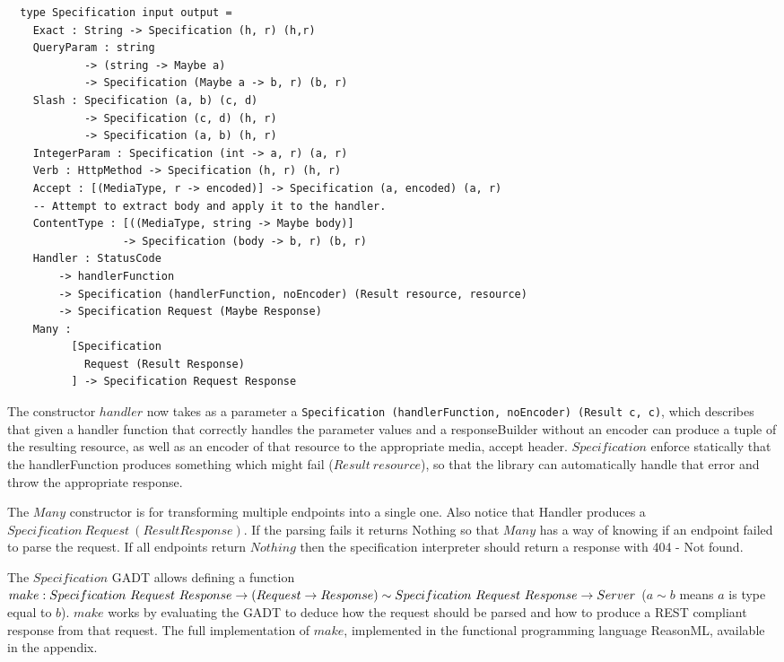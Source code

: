 \begin{lstlisting}
  type Specification input output =
    Exact : String -> Specification (h, r) (h,r)
    QueryParam : string 
            -> (string -> Maybe a) 
            -> Specification (Maybe a -> b, r) (b, r)
    Slash : Specification (a, b) (c, d) 
            -> Specification (c, d) (h, r) 
            -> Specification (a, b) (h, r) 
    IntegerParam : Specification (int -> a, r) (a, r)
    Verb : HttpMethod -> Specification (h, r) (h, r)
    Accept : [(MediaType, r -> encoded)] -> Specification (a, encoded) (a, r)
    -- Attempt to extract body and apply it to the handler.
    ContentType : [((MediaType, string -> Maybe body)]
                  -> Specification (body -> b, r) (b, r)
    Handler : StatusCode 
        -> handlerFunction 
        -> Specification (handlerFunction, noEncoder) (Result resource, resource)
        -> Specification Request (Maybe Response)
    Many :
          [Specification 
            Request (Result Response)
          ] -> Specification Request Response
\end{lstlisting}

The constructor $handler$ now takes as a parameter a \texttt{Specification
(handlerFunction, noEncoder) (Result c, c)}, which describes that given a
handler function that correctly handles the parameter values and a
responseBuilder without an encoder can produce a tuple of the resulting
resource, as well as an encoder of that resource to the appropriate media,
accept header. $Specification$ enforce statically that the handlerFunction
produces something which might fail ($Result\ resource$), so that the library
can automatically handle that error and throw the appropriate response. 

The $Many$ constructor is for transforming multiple endpoints into a single one.
Also notice that Handler produces a $Specification\ Request\ (Result Response)$.
If the parsing fails it returns Nothing so that $Many$ has a way of knowing if
an endpoint failed to parse the request. If all endpoints return $Nothing$ then
the specification interpreter should return a response with  404 - Not found.

The $Specification$ GADT allows defining a function\\ $make : Specification\
Request\ Response \rightarrow (Request \rightarrow Response) \sim\\
Specification\ Request\ Response \rightarrow Server$ ($a\sim b$ means $a$ is
type equal to $b$).  $make$ works by evaluating the GADT to deduce how the
request should be parsed and how to produce a REST compliant response from that
request.  The full implementation of $make$, implemented in the functional
programming language ReasonML, available in the appendix.

